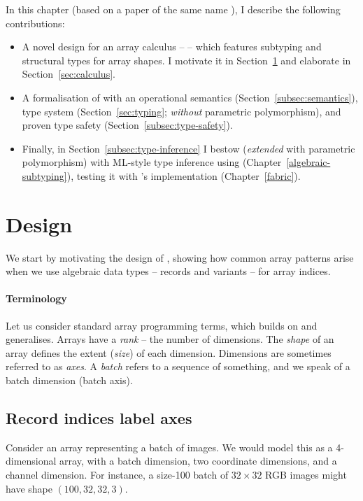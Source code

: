 In this chapter (based on a paper of the same name \cite{star}), I describe the following contributions: \begin{itemize}
    \item A novel design for an array calculus – \starr{} – which features subtyping and structural types for array shapes. I motivate it in Section~\ref{sec:design} and elaborate in Section~\ref{sec:calculus}.
    \item A formalisation of with an operational semantics (Section~\ref{subsec:semantics}), type system (Section~\ref{sec:typing};  \emph{without} parametric polymorphism), and proven type safety (Section~\ref{subsec:type-safety}).
    \item Finally, in Section~\ref{subsec:type-inference} I bestow \starr{} (\emph{extended} with parametric polymorphism) with ML-style type inference using \inference{} (Chapter~\ref{algebraic-subtyping}), testing it with \compiler{}'s implementation (Chapter~\ref{fabric}).
\end{itemize}

\newpage
\section{Design}
\label{sec:design}

We start by motivating the design of \starr{}, showing how common array patterns arise when we use algebraic data types -- records and variants -- for array indices.

\paragraph{Terminology} Let us consider standard array programming terms, which \starr{} builds on and generalises. Arrays have a \emph{rank} -- the number of dimensions. The \emph{shape} of an array defines the extent (\emph{size}) of
each dimension. Dimensions are sometimes referred to as \emph{axes}.
A \emph{batch} refers to a sequence of something, and we speak of a batch dimension (batch axis).

\subsection{Record indices label axes}

Consider an array representing a batch of images. We would model this as a 4-dimensional array, with a batch dimension, two coordinate dimensions, and a channel dimension. For instance, a size-100 batch of $32 \times 32$ RGB images might have shape $(100, 32, 32, 3)$.

